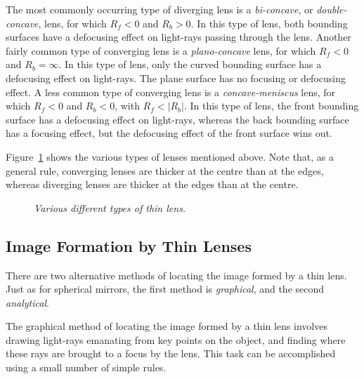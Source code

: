 The most commonly occurring type of diverging lens is a {\em bi-concave},
or {\em double-concave}, lens, for which $R_f<0$ and $R_b>0$. In this
type of lens, both bounding surfaces have a defocusing effect on light-rays
passing through the lens. Another fairly common type of
converging lens is a {\em plano-concave}\/ lens, for which
$R_f<0$ and $R_b=\infty$. In this type of
lens, only the curved bounding surface has a defocusing effect on light-rays. The plane surface has no focusing or defocusing effect. 
A less common type of converging lens is a {\em concave-meniscus}\/
lens, for which $R_f<0$ and $R_b<0$, with $R_f<|R_b|$. In this type
of lens, the front bounding surface has a defocusing effect on light-rays,
whereas the back bounding surface has a focusing effect, but the
defocusing effect of the front surface wins out. 

Figure~\ref{f13.12} shows the various types of lenses mentioned above. Note
that, as a general rule, converging lenses are thicker at the centre
than at the edges, whereas diverging lenses are thicker at the
edges than at the centre.

\begin{figure}[h]
\epsfysize=3.5in
\centerline{}
\caption{\em Various different types of thin lens.}\label{f13.12}
\end{figure}

\subsection{Image Formation by Thin Lenses}
There are two alternative methods of locating the image formed by
a thin lens. 
Just as for
spherical mirrors, the first method is {\em graphical}, and the second  {\em analytical}. 

The graphical method of locating the image formed by a
thin lens involves drawing light-rays emanating from key points
on the object, and finding where these rays are brought to
a focus by the lens. This task can be accomplished using a
small number of simple rules. 

